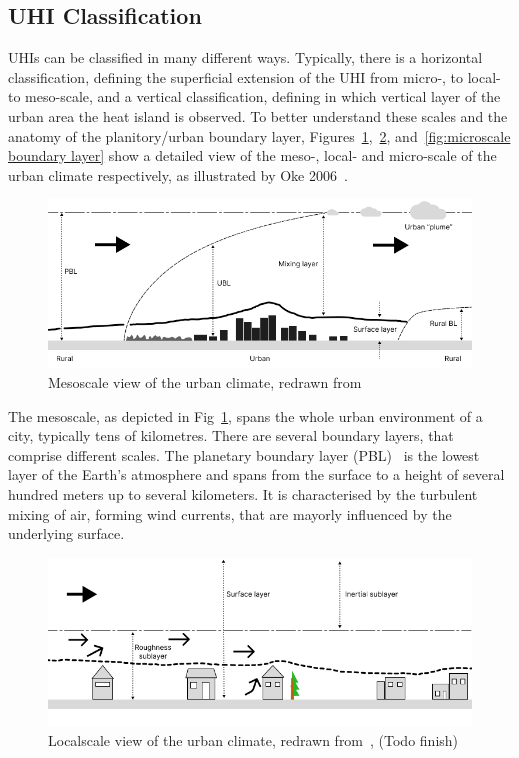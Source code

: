 \subsection{UHI Classification}

UHIs can be classified in many different ways. Typically, there is a horizontal classification, defining the superficial extension of the UHI from micro-, to local- to meso-scale, and a vertical classification, defining in which vertical layer of the urban area the heat island is observed. To better understand these scales and the anatomy of the planitory/urban boundary layer, Figures~\ref{fig:mesoscale boundary layer},~\ref{fig:localscale boundary layer}, and~\ref{fig:microscale boundary layer} show a detailed view of the meso-, local- and micro-scale of the urban climate respectively, as illustrated by Oke 2006~\cite{oke2006guideline}.

\begin{figure}[h]
    \centering
    \includegraphics[width=\textwidth]{images/Mesoscale Boundary Layer.png}
    \caption{Mesoscale view of the urban climate, redrawn from~\cite{oke2006guideline}}
    \label{fig:mesoscale boundary layer}
\end{figure}

The mesoscale, as depicted in Fig~\ref{fig:mesoscale boundary layer}, spans the whole urban environment of a city, typically tens of kilometres. There are several boundary layers, that comprise different scales. The planetary boundary layer (PBL)~\cite{wyngaard1985structure} is the lowest layer of the Earth's atmosphere and spans from the surface to a height of several hundred meters up to several kilometers. It is characterised by the turbulent mixing of air, forming wind currents, that are mayorly influenced by the underlying surface.

\begin{figure}[h]
    \centering
    \includegraphics[width=\textwidth]{images/Localscale Boundary Layer.png}
    \caption{Localscale view of the urban climate, redrawn from~\cite{oke2006guideline}, (Todo finish)}
    \label{fig:localscale boundary layer}
\end{figure}

